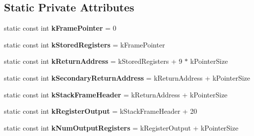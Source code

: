 \subsection*{Static Private Attributes}
\begin{DoxyCompactItemize}
\item 
static const int {\bfseries k\+Frame\+Pointer} = 0\hypertarget{classv8_1_1internal_1_1_reg_exp_macro_assembler_m_i_p_s_a4f040d490d7ea20b442e42dd11f0ad8f}{}\label{classv8_1_1internal_1_1_reg_exp_macro_assembler_m_i_p_s_a4f040d490d7ea20b442e42dd11f0ad8f}

\item 
static const int {\bfseries k\+Stored\+Registers} = k\+Frame\+Pointer\hypertarget{classv8_1_1internal_1_1_reg_exp_macro_assembler_m_i_p_s_a788738b966c02794310e14656216771f}{}\label{classv8_1_1internal_1_1_reg_exp_macro_assembler_m_i_p_s_a788738b966c02794310e14656216771f}

\item 
static const int {\bfseries k\+Return\+Address} = k\+Stored\+Registers + 9 $\ast$ k\+Pointer\+Size\hypertarget{classv8_1_1internal_1_1_reg_exp_macro_assembler_m_i_p_s_aac3025c135af172430072e10d60bd5bd}{}\label{classv8_1_1internal_1_1_reg_exp_macro_assembler_m_i_p_s_aac3025c135af172430072e10d60bd5bd}

\item 
static const int {\bfseries k\+Secondary\+Return\+Address} = k\+Return\+Address + k\+Pointer\+Size\hypertarget{classv8_1_1internal_1_1_reg_exp_macro_assembler_m_i_p_s_af97d5616deec269b253d47e0f15d989e}{}\label{classv8_1_1internal_1_1_reg_exp_macro_assembler_m_i_p_s_af97d5616deec269b253d47e0f15d989e}

\item 
static const int {\bfseries k\+Stack\+Frame\+Header} = k\+Return\+Address + k\+Pointer\+Size\hypertarget{classv8_1_1internal_1_1_reg_exp_macro_assembler_m_i_p_s_a3f2075c1d81bd338570eaac2a4991d30}{}\label{classv8_1_1internal_1_1_reg_exp_macro_assembler_m_i_p_s_a3f2075c1d81bd338570eaac2a4991d30}

\item 
static const int {\bfseries k\+Register\+Output} = k\+Stack\+Frame\+Header + 20\hypertarget{classv8_1_1internal_1_1_reg_exp_macro_assembler_m_i_p_s_a4d6278c014c99a50078a46aae080e434}{}\label{classv8_1_1internal_1_1_reg_exp_macro_assembler_m_i_p_s_a4d6278c014c99a50078a46aae080e434}

\item 
static const int {\bfseries k\+Num\+Output\+Registers} = k\+Register\+Output + k\+Pointer\+Size\hypertarget{classv8_1_1internal_1_1_reg_exp_macro_assembler_m_i_p_s_ab0011192fa6e465e6f7da61c4c39b069}{}\label{classv8_1_1internal_1_1_reg_exp_macro_assembler_m_i_p_s_ab0011192fa6e465e6f7da61c4c39b069}


\end{DoxyCompactItemize}
